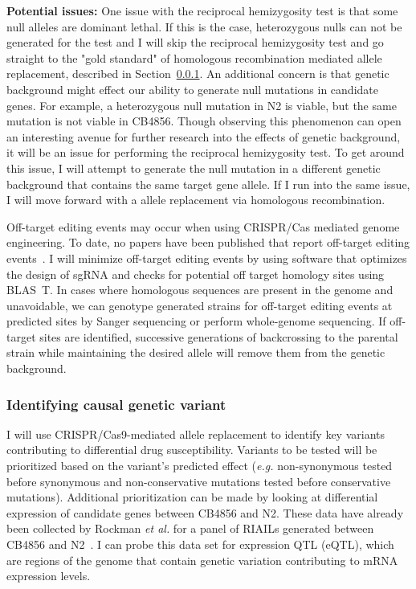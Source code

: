 \documentclass[12pt]{article}
\begin{document}
\vspace{5pt}
{\bf Potential issues: }One issue with the reciprocal hemizygosity test is that some null alleles are dominant lethal. If this is the case, heterozygous nulls can not be generated for the test and I will skip the reciprocal hemizygosity test and go straight to the "gold standard" of homologous recombination mediated allele replacement, described in Section~\ref{Aim22}. An additional concern is that genetic background might effect our ability to generate null mutations in candidate genes. For example, a heterozygous null mutation in N2 is viable, but the same mutation is not viable in CB4856. Though observing this phenomenon can open an interesting avenue for further research into the effects of genetic background, it will be an issue for performing the reciprocal hemizygosity test. To get around this issue, I will attempt to generate the null mutation in a different genetic background that contains the same target gene allele. If I run into the same issue, I will move forward with a allele replacement via homologous recombination. 
\vspace{5pt}

Off-target editing events may occur when using CRISPR/Cas mediated genome engineering. To date, no papers have been published that report off-target editing events~\cite{Paix:2014eu}. I will minimize off-target editing events by using software that optimizes the design of sgRNA and checks for potential off target homology sites using BLAS~\cite{Hsu:2013kc}T. In cases where homologous sequences are present in the genome and unavoidable, we can genotype generated strains for off-target editing events at predicted sites by Sanger sequencing or perform whole-genome sequencing. If off-target sites are identified, successive generations of backcrossing to the parental strain while maintaining the desired allele will remove them from the genetic background. 
\vspace{-5pt}
\subsubsection{Identifying causal genetic variant}\label{Aim22}

I will use CRISPR/Cas9-mediated allele replacement to identify key variants contributing to differential drug susceptibility. Variants to be tested will be prioritized based on the variant's predicted effect ({\it e.g.} non-synonymous tested before synonymous and non-conservative mutations tested before conservative mutations). Additional prioritization can be made by looking at differential expression of candidate genes between CB4856 and N2. These data have already been collected by Rockman {\it et al.} for a panel of RIAILs generated between CB4856 and N2~\cite{Rockman:2010du}. I can probe this data set for expression QTL (eQTL), which are regions of the genome that contain genetic variation contributing to mRNA expression levels. 
\vspace{5pt}
\end{document}
